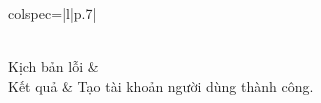 \documentclass{article}
\begin{document}
\begin{longtblr}[caption = {Đặc tả usecase Tạo tài khoản người dùng},
  label = {tab:usecase1-spec},]{colspec={|l|p{.7\linewidth}|}}
\begin{minipage}{\linewidth}
\begin{enumerate}[label={\textbf{\textcolor{red}{A\arabic*}} --}, align=left, itemsep=-5pt]
    \end{enumerate}
    \vskip 1pt
  \end{minipage}
  \\\hline
  Kịch bản lỗi         &                                                                                              \\\hline
  Kết quả              & Tạo tài khoản người dùng thành công.                                                                 \\\hline
\end{longtblr}
\end{document}
